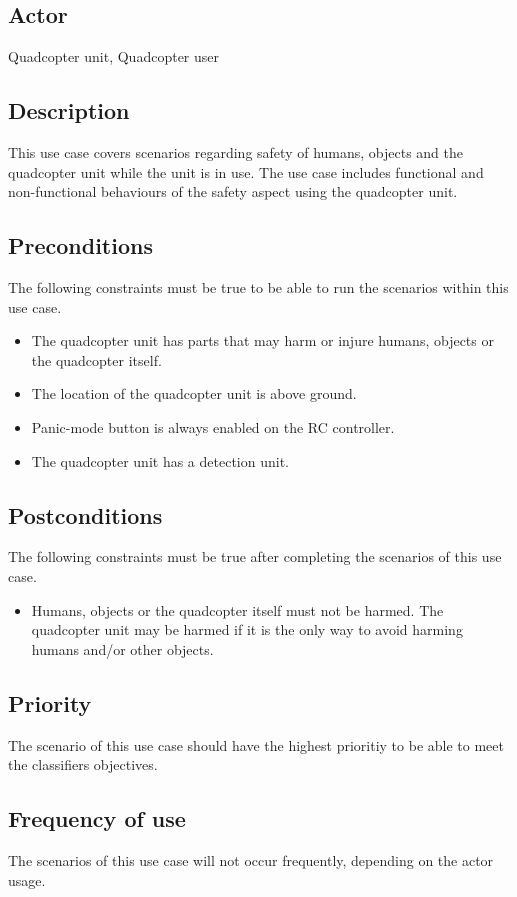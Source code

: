 \documentclass[a4paper]{article}
\begin{document}
\subsection{Actor}
Quadcopter unit, Quadcopter user
\subsection{Description}
This use case covers scenarios regarding safety of humans, objects and the quadcopter unit while the unit is in use. The use case includes functional and non-functional behaviours of the safety aspect using the quadcopter unit. 
\subsection{Preconditions}
The following constraints must be true to be able to run the scenarios within this use case.
\begin{itemize}
\item The quadcopter unit has parts that may harm or injure humans, objects or the quadcopter itself.
\item The location of the quadcopter unit is above ground.
\item Panic-mode button is always enabled on the RC controller.
\item The quadcopter unit has a detection unit.
\end{itemize}
\subsection{Postconditions}
The following constraints must be true after completing the scenarios of this use case.
\begin{itemize}
\item Humans, objects or the quadcopter itself must not be harmed. The quadcopter unit may be harmed if it is the only way to avoid harming humans and/or other objects.
\end{itemize}
\subsection{Priority}
The scenario of this use case should have the highest prioritiy to be able to meet the classifiers objectives.
\subsection{Frequency of use}
The scenarios of this use case will not occur frequently, depending on the actor usage.
\end{document}
